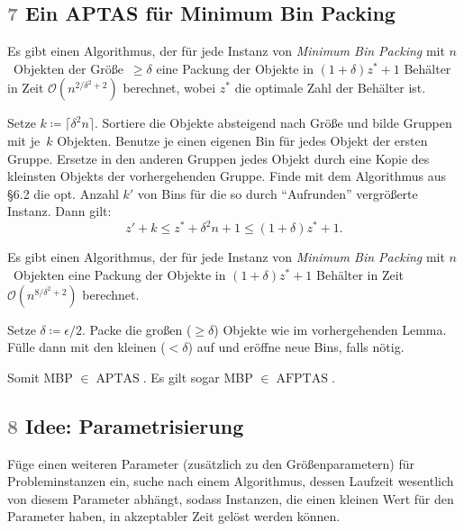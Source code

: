 \documentclass{cheat-sheet}
\DeclareMathOperator{\APTAS}{APTAS} %
\DeclareMathOperator{\AFPTAS}{AFPTAS} %
\renewcommand{\O}{\mathcal{O}} %
\newcommand{\ceil}[1]{\lceil #1 \rceil} %
\newcommand{\Problem}[1]{\textcolor{ProblemColor}{\textbf{#1}}}
\newcommand{\scriptSection}[1]{\textcolor{gray}{#1}\enspace}
\begin{document}
\subsection{\scriptSection{7} Ein APTAS für \Problem{Minimum Bin Packing}}

\begin{lem}
  Es gibt einen Algorithmus, der für jede Instanz von \textit{Minimum Bin Packing} mit $n$~Objekten der Größe~$\geq \delta$ eine Packung der Objekte in $(1 + \delta) z^* + 1$ Behälter in Zeit $\O(n^{2/\delta^2 + 2})$ berechnet, wobei $z^*$ die optimale Zahl der Behälter ist.
\end{lem}

\begin{alg}
  Setze $k \coloneqq \ceil{\delta^2 n}$.
  Sortiere die Objekte absteigend nach Größe und bilde Gruppen mit je~$k$ Objekten.
  Benutze je einen eigenen Bin für jedes Objekt der ersten Gruppe.
  Ersetze in den anderen Gruppen jedes Objekt durch eine Kopie des kleinsten Objekts der vorhergehenden Gruppe.
  Finde mit dem Algorithmus aus §6.2 die opt. Anzahl $k'$ von Bins für die so durch "`Aufrunden"' vergrößerte Instanz.
  Dann gilt:
  \[
    z' + k \leq z^* + \delta^2 n + 1 \leq (1 + \delta) z^* + 1.
  \]
\end{alg}

\begin{satz}
  Es gibt einen Algorithmus, der für jede Instanz von \textit{Minimum Bin Packing} mit $n$~Objekten eine Packung der Objekte in $(1 + \delta) z^* + 1$ Behälter in Zeit $\O(n^{8/\delta^2 + 2})$ berechnet.
\end{satz}

\begin{alg}
  Setze $\delta \coloneqq \epsilon / 2$.
  Packe die großen ($\geq \delta$) Objekte wie im vorhergehenden Lemma.
  Fülle dann mit den kleinen ($< \delta$) auf und eröffne neue Bins, falls nötig.
\end{alg}

\begin{bem}
  Somit MBP $\in \APTAS$.
  Es gilt sogar MBP $\in \AFPTAS$.
\end{bem}

\subsection{\scriptSection{8} Idee: Parametrisierung}

\begin{vorgehen}
  Füge einen weiteren Parameter (zusätzlich zu den Größenparametern) für Probleminstanzen ein, suche nach einem Algorithmus, dessen Laufzeit wesentlich von diesem Parameter abhängt, sodass Instanzen, die einen kleinen Wert für den Parameter haben, in akzeptabler Zeit gelöst werden können.
\end{vorgehen}
\end{document}
